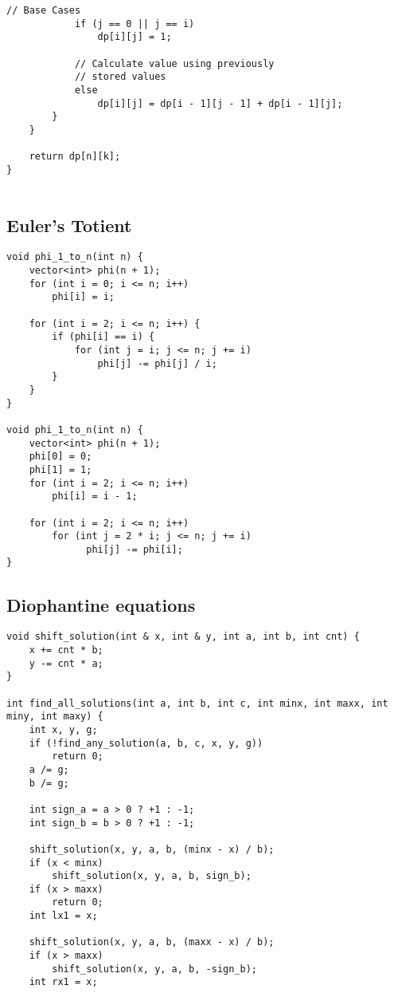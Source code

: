 \documentclass[10pt]{article}
\begin{document}
\begin{multicols*}{2}
\begin{lstlisting}[style=compactcpp]
            // Base Cases
            if (j == 0 || j == i)
                dp[i][j] = 1;

            // Calculate value using previously
            // stored values
            else
                dp[i][j] = dp[i - 1][j - 1] + dp[i - 1][j];
        }
    }

    return dp[n][k];
}
    
\end{lstlisting}


\subsection{Euler's Totient}

\begin{lstlisting}[style=compactcpp]
void phi_1_to_n(int n) {
    vector<int> phi(n + 1);
    for (int i = 0; i <= n; i++)
        phi[i] = i;

    for (int i = 2; i <= n; i++) {
        if (phi[i] == i) {
            for (int j = i; j <= n; j += i)
                phi[j] -= phi[j] / i;
        }
    }
}

void phi_1_to_n(int n) {
    vector<int> phi(n + 1);
    phi[0] = 0;
    phi[1] = 1;
    for (int i = 2; i <= n; i++)
        phi[i] = i - 1;

    for (int i = 2; i <= n; i++)
        for (int j = 2 * i; j <= n; j += i)
              phi[j] -= phi[i];
}
\end{lstlisting}

\subsection{Diophantine equations}

\begin{lstlisting}[style=compactcpp]
void shift_solution(int & x, int & y, int a, int b, int cnt) {
    x += cnt * b;
    y -= cnt * a;
}

int find_all_solutions(int a, int b, int c, int minx, int maxx, int miny, int maxy) {
    int x, y, g;
    if (!find_any_solution(a, b, c, x, y, g))
        return 0;
    a /= g;
    b /= g;

    int sign_a = a > 0 ? +1 : -1;
    int sign_b = b > 0 ? +1 : -1;

    shift_solution(x, y, a, b, (minx - x) / b);
    if (x < minx)
        shift_solution(x, y, a, b, sign_b);
    if (x > maxx)
        return 0;
    int lx1 = x;

    shift_solution(x, y, a, b, (maxx - x) / b);
    if (x > maxx)
        shift_solution(x, y, a, b, -sign_b);
    int rx1 = x;


\end{lstlisting}
\end{multicols*}
\end{document}

